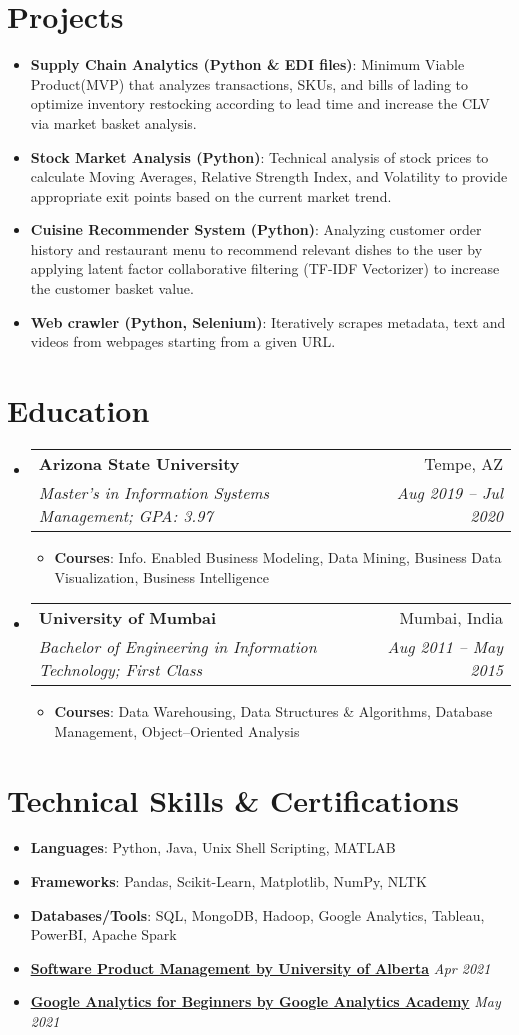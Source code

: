 \documentclass[letterpaper,10pt]{article}
\makeatletter
\newcommand{\resumeItem}[2]{
  \item\small{
    \textbf{#1}{: #2 \vspace{-2pt}}
  }
}
\newcommand{\resumeItemNoColon}[2]{
  \item\small{
    \textbf{#1}{ #2 \vspace{-2pt}}
  }
}
\newcommand{\resumeSubheading}[4]{
  \vspace{2pt}\item
    \begin{tabular*}{0.97\textwidth}{l@{\extracolsep{\fill}}r}
      \textbf{#1} & #2 \\
      \textit{\small#3} & \textit{\small #4} \\
    \end{tabular*}\vspace{-5pt}
}
\newcommand{\resumeSubItem}[2]{\resumeItem{#1}{#2}\vspace{-2pt}}
\newcommand{\resumeSubItemNoColon}[2]{\resumeItemNoColon{#1}{#2}\vspace{-4pt}}
\newcommand{\resumeSubHeadingListStart}{\begin{itemize}[leftmargin=*]}
\newcommand{\resumeSubHeadingListEnd}{\end{itemize}}
\newcommand{\resumeItemListStart}{\begin{itemize}}
\newcommand{\resumeItemListEnd}{\end{itemize}\vspace{-5pt}}
\def\faGraduationCap{\unichar{"F19D}}
\def\faFlask{\unichar{"F0C3}}
\def\faGears{\unichar{"F085}}
\makeatother
\begin{document}
\section{{\faFlask} Projects}
\vspace{4pt}
  \resumeSubHeadingListStart
    \resumeSubItem{Supply Chain Analytics (Python \& EDI files)}
    {Minimum Viable Product(MVP) that analyzes transactions, SKUs, and bills of lading to optimize inventory restocking according to lead time and increase the CLV via market basket analysis.}
   \resumeSubItem{Stock Market Analysis (Python)}
    {Technical analysis of stock prices to calculate Moving Averages, Relative Strength Index, and Volatility to provide appropriate exit points based on the current market trend.}
    \resumeSubItem{Cuisine Recommender System (Python)}
     {Analyzing customer order history and restaurant menu to recommend relevant dishes to the user by applying latent factor collaborative filtering (TF-IDF Vectorizer) to increase the customer basket value.}
    \resumeSubItem{Web crawler (Python, Selenium)}
    {Iteratively scrapes metadata, text and videos from webpages starting from a given URL.}
 
  \resumeSubHeadingListEnd



\section {{\faGraduationCap} Education}
  \resumeSubHeadingListStart
  \resumeSubheading
      {Arizona State University}{Tempe, AZ}
      {Master's in Information Systems Management; GPA: 3.97}{Aug 2019 -- Jul 2020}
      \resumeItemListStart
       \resumeItem{Courses}
       {Info. Enabled Business Modeling, Data Mining, Business Data Visualization, Business Intelligence}
       \resumeItemListEnd
    \resumeSubheading
      {University of Mumbai}{Mumbai, India}
      {Bachelor of Engineering in Information Technology;  First Class}{Aug 2011 -- May 2015}
      \resumeItemListStart
      \resumeItem{Courses}
       {Data Warehousing, Data Structures \& Algorithms, Database Management, Object--Oriented Analysis}
       \resumeItemListEnd
  \resumeSubHeadingListEnd


\section{{\faGears} Technical Skills \& Certifications}
\vspace{4pt}
 \resumeSubHeadingListStart
 \resumeSubItem{Languages}{Python, Java, Unix Shell Scripting, MATLAB}
 \resumeSubItem{Frameworks}{Pandas, Scikit-Learn,  Matplotlib, NumPy, NLTK}
 \resumeSubItem{Databases/Tools}{SQL, MongoDB, Hadoop, Google Analytics, Tableau, PowerBI, Apache Spark}
 \resumeSubItemNoColon{\href{https://coursera.org/share/9834e0256629ce5b4fa655625566ce44}{\underline{Software Product Management} by University of Alberta}}\hfill\emph{Apr 2021}
 \resumeSubItemNoColon{\href{https://analytics.google.com/analytics/academy/certificate/OEBBwV8eQrGW62SQrICQ4Q}{\underline{Google Analytics for Beginners} by Google Analytics Academy}}\hfill\emph{May 2021}
 
 \resumeSubHeadingListEnd
\end{document}
